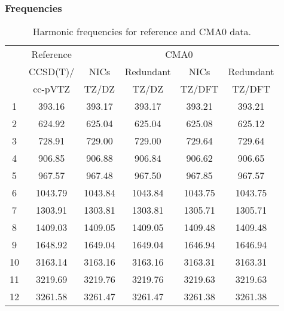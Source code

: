 \documentclass[10pt,oneside]{article}
\begin{document}
\begin{table}[h!]
\subsubsection*{Frequencies}
\centering
\caption{Harmonic frequencies for reference and CMA0 data.}
\begin{tabular}{cccccc}
\toprule
{} & Reference & \multicolumn{4}{c}{CMA0} \\
{} &  CCSD(T)/ &    NICs &  Redundant &    NICs & Redundant \\
{} &   cc-pVTZ &   TZ/DZ &      TZ/DZ &  TZ/DFT &    TZ/DFT \\
\midrule
1  &    393.16 &  393.17 &     393.17 &  393.21 &    393.21 \\
2  &    624.92 &  625.04 &     625.04 &  625.08 &    625.12 \\
3  &    728.91 &  729.00 &     729.00 &  729.64 &    729.64 \\
4  &    906.85 &  906.88 &     906.84 &  906.62 &    906.65 \\
5  &    967.57 &  967.48 &     967.50 &  967.85 &    967.57 \\
6  &   1043.79 & 1043.84 &    1043.84 & 1043.75 &   1043.75 \\
7  &   1303.91 & 1303.81 &    1303.81 & 1305.71 &   1305.71 \\
8  &   1409.03 & 1409.05 &    1409.05 & 1409.48 &   1409.48 \\
9  &   1648.92 & 1649.04 &    1649.04 & 1646.94 &   1646.94 \\
10 &   3163.14 & 3163.16 &    3163.16 & 3163.31 &   3163.31 \\
11 &   3219.69 & 3219.76 &    3219.76 & 3219.63 &   3219.63 \\
12 &   3261.58 & 3261.47 &    3261.47 & 3261.38 &   3261.38 \\
\bottomrule
\end{tabular}
\end{table}
\end{document}
